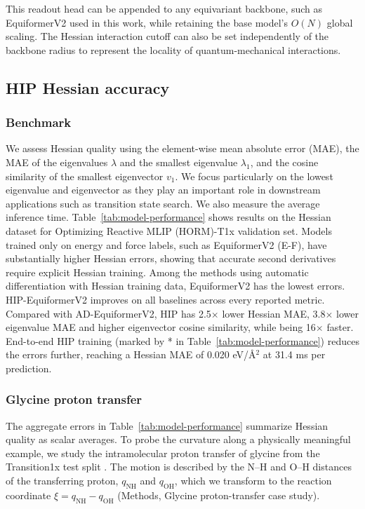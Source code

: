 \documentclass[pdflatex,sn-mathphys-num]{sn-jnl}%
\begin{document}
This readout head can be appended to any equivariant backbone, such as EquiformerV2\cite{liao2023equiformerv2} used in this work, while retaining the base model's $O(N)$ global scaling. The Hessian interaction cutoff can also be set independently of the backbone radius to represent the locality of quantum-mechanical interactions.


\subsection{HIP Hessian accuracy}
\subsubsection{Benchmark}
We assess Hessian quality using the element-wise mean absolute error (MAE), the MAE of the eigenvalues $\lambda$ and the smallest eigenvalue $\lambda_1$, and the cosine similarity of the smallest eigenvector $v_1$. We focus particularly on the lowest eigenvalue and eigenvector as they play an important role in downstream applications such as transition state search. We also measure the average inference time. Table~\ref{tab:model-performance} shows results on the Hessian dataset for Optimizing Reactive MLIP (HORM)-T1x validation set.
Models trained only on energy and force labels, such as EquiformerV2 (E-F), have substantially higher Hessian errors, showing that accurate second derivatives require explicit Hessian training. Among the methods using automatic differentiation with Hessian training data, EquiformerV2 has the lowest errors. HIP-EquiformerV2 improves on all baselines across every reported metric. Compared with AD-EquiformerV2, HIP has 2.5$\times$ lower Hessian MAE, 3.8$\times$ lower eigenvalue MAE and higher eigenvector cosine similarity, while being 16$\times$ faster. End-to-end HIP training (marked by * in Table~\ref{tab:model-performance}) reduces the errors further, reaching a Hessian MAE of 0.020 eV/\AA$^2$ at 31.4 ms per prediction. 

\subsubsection{Glycine proton transfer}
The aggregate errors in Table~\ref{tab:model-performance} summarize Hessian quality as scalar averages. To probe the curvature along a physically meaningful example, we study the intramolecular proton transfer of glycine from the Transition1x test split \cite{schreiner2022transition1x}. The motion is described by the N--H and O--H distances of the transferring proton, \(q_{\mathrm{NH}}\) and \(q_{\mathrm{OH}}\), which we transform to the reaction coordinate \(\xi=q_{\mathrm{NH}}-q_{\mathrm{OH}}\) (Methods, Glycine proton-transfer case study).
\end{document}
